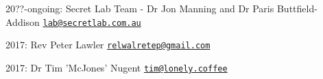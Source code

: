 
\begin{DoxyItemize}
\item 20??-\/ongoing\-: Secret Lab Team -\/ Dr Jon Manning and Dr Paris Buttfield-\/\-Addison \href{mailto:lab@secretlab.com.au}{\tt lab@secretlab.\-com.\-au}
\item 2017\-: Rev Peter Lawler \href{mailto:relwalretep@gmail.com}{\tt relwalretep@gmail.\-com}
\item 2017\-: Dr Tim 'Mc\-Jones' Nugent \href{mailto:tim@lonely.coffee}{\tt tim@lonely.\-coffee} 
\end{DoxyItemize}